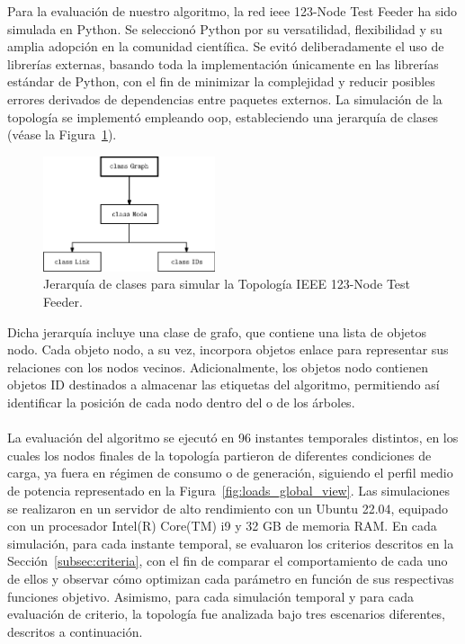 Para la evaluación de nuestro algoritmo, la red \gls{ieee} 123-Node Test Feeder ha sido simulada en Python. Se seleccionó Python por su versatilidad, flexibilidad y su amplia adopción en la comunidad científica. Se evitó deliberadamente el uso de librerías externas, basando toda la implementación únicamente en las librerías estándar de Python, con el fin de minimizar la complejidad y reducir posibles errores derivados de dependencias entre paquetes externos. La simulación de la topología se implementó empleando \gls{oop}, estableciendo una jerarquía de clases (véase la Figura~\ref{fig:uml}). 

\begin{figure}[ht!]
    \centering
    \includegraphics[width=0.45\textwidth]{fig/07_bloste/bloste_07.eps}
    \caption{Jerarquía de clases para simular la Topología IEEE 123-Node Test Feeder.}
    \label{fig:uml}
\end{figure}

Dicha jerarquía incluye una clase de grafo, que contiene una lista de objetos nodo. Cada objeto nodo, a su vez, incorpora objetos enlace para representar sus relaciones con los nodos vecinos. Adicionalmente, los objetos nodo contienen objetos ID destinados a almacenar las etiquetas del algoritmo, permitiendo así identificar la posición de cada nodo dentro del o de los árboles.\\
\\
La evaluación del algoritmo se ejecutó en 96 instantes temporales distintos, en los cuales los nodos finales de la topología partieron de diferentes condiciones de carga, ya fuera en régimen de consumo o de generación, siguiendo el perfil medio de potencia representado en la Figura~\ref{fig:loads_global_view}. Las simulaciones se realizaron en un servidor de alto rendimiento con un Ubuntu 22.04, equipado con un procesador Intel(R) Core(TM) i9 y 32 GB de memoria RAM. En cada simulación, para cada instante temporal, se evaluaron los criterios descritos en la Sección~\ref{subsec:criteria}, con el fin de comparar el comportamiento de cada uno de ellos y observar cómo optimizan cada parámetro en función de sus respectivas funciones objetivo. Asimismo, para cada simulación temporal y para cada evaluación de criterio, la topología fue analizada bajo tres escenarios diferentes, descritos a continuación.\\

